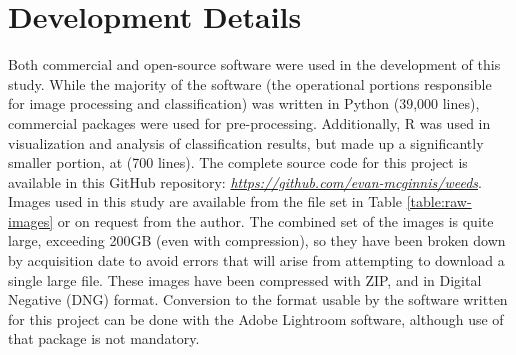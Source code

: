 \documentclass[letterpaper, notitlepage]{report}
\begin{document}
\chapter{Development Details}
Both commercial and open-source software were used in the development of this study. While the majority of the software (the operational portions responsible for image processing and classification) was written in Python (39,000 lines), commercial packages were used for pre-processing. Additionally, R was used in visualization and analysis of classification results, but made up a significantly smaller portion, at (700 lines). The complete source code for this project is available in this GitHub repository: \href{https://github.com/evan-mcginnis/weeds}{\textit {https://github.com/evan-mcginnis/weeds}}. Images used in this study are available from the file set in Table \ref{table:raw-images} or on request from the author. The combined set of the images is quite large, exceeding 200GB (even with compression), so they have been broken down by acquisition date to avoid errors that will arise from attempting to download a single large file.  These images have been compressed with ZIP, and in Digital Negative (DNG) format. Conversion to the format usable by the software written for this project can be done with the Adobe Lightroom software, although use of that package is not mandatory.
\end{document}
